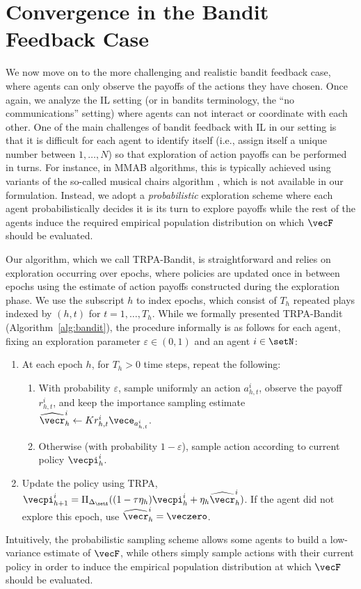 
\section{Convergence in the Bandit Feedback Case}\label{sec:bandit_feedback_results}

We now move on to the more challenging and realistic bandit feedback case, where agents can only observe the payoffs of the actions they have chosen.
Once again, we analyze the IL setting (or in bandits terminology, the ``no communications'' setting) where agents can not interact or coordinate with each other.
One of the main challenges of bandit feedback with IL in our setting is that it is difficult for each agent to identify itself (i.e., assign itself a unique number between $1,\ldots,N$) so that exploration of action payoffs can be performed in turns.
For instance, in MMAB algorithms, this is typically achieved using variants of the so-called musical chairs algorithm \citep{lugosi2022multiplayer}, which is not available in our formulation.
Instead, we adopt a \emph{probabilistic} exploration scheme where each agent probabilistically decides it is its turn to explore payoffs while the rest of the agents induce the required empirical population distribution on which $\vecF$ should be evaluated.

Our algorithm, which we call TRPA-Bandit, is straightforward and relies on exploration occurring over epochs, where policies are updated once in between epochs using the estimate of action payoffs constructed during the exploration phase.
We use the subscript $h$ to index epochs, which consist of $T_h$ repeated plays indexed by $(h,t)$ for $t=1,\ldots,T_h$.
While we formally presented TRPA-Bandit (Algorithm~\ref{alg:bandit}), the procedure informally is as follows for each agent, fixing an exploration parameter $\varepsilon \in (0,1)$ and an agent $i\in\setN$:
\begin{enumerate}
    \item At each epoch $h$, for $T_h > 0$ time steps, repeat the following:
    \begin{enumerate}
        \item With probability $\varepsilon$, sample uniformly an action $a^i_{h,t}$, observe the payoff $r^i_{h,t}$, and keep the importance sampling estimate $\widehat{\vecr}^i_h \leftarrow K r_{h,t}^i \vece_{a^i_{h,t}}$.
        \item Otherwise (with probability $1-\varepsilon$), sample action according to current policy $\vecpi^i_h$.
    \end{enumerate}
    \item Update the policy using TRPA, $\vecpi^i_{h+1} = \Pi_{\Delta_\setA} ( (1 - \tau \eta_h) \vecpi^i_h + \eta_h \widehat{\vecr}^i_h )$.
    If the agent did not explore this epoch, use $\widehat{\vecr}^i_h = \veczero$.
\end{enumerate}
Intuitively, the probabilistic sampling scheme allows some agents to build a low-variance estimate of $\vecF$, while others simply sample actions with their current policy in order to induce the empirical population distribution at which $\vecF$ should be evaluated.

